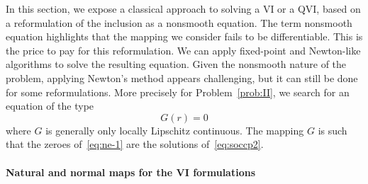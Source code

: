 {In this section, we expose a classical approach to solving a VI or a QVI, based on a reformulation of the inclusion as a nonsmooth equation.
The term nonsmooth equation highlights that the mapping we consider fails to be differentiable.
This is the price to pay for this reformulation. We can apply fixed-point and Newton-like algorithms to solve the resulting equation.
Given the nonsmooth nature of the problem, applying Newton's method appears challenging, but it can still be done for some reformulations.
%
More precisely for Problem~\ref{prob:II}, we search for an equation of the type
\begin{equation}
  \label{eq:ne-1}
  G(r) = 0
\end{equation}
where $G$ is generally {only} locally Lipschitz continuous. The mapping $G$ is such that the zeroes  of~\eqref{eq:ne-1} are the solutions of~\eqref{eq:soccp2}.

\paragraph{Natural and normal maps for the VI formulations}

}
